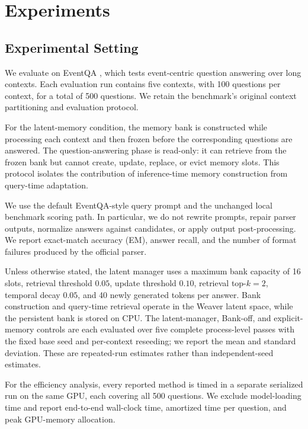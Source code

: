 \section{Experiments}
\label{sec:experiments}

\subsection{Experimental Setting}

We evaluate on EventQA \cite{hu2026evaluating}, which tests event-centric question answering over long contexts.  Each evaluation run contains five contexts, with 100 questions per context, for a total of 500 questions.  We retain the benchmark's original context partitioning and evaluation protocol.

For the latent-memory condition, the memory bank is constructed while processing each context and then frozen before the corresponding questions are answered.  The question-answering phase is read-only: it can retrieve from the frozen bank but cannot create, update, replace, or evict memory slots.  This protocol isolates the contribution of inference-time memory construction from query-time adaptation.

We use the default EventQA-style query prompt and the unchanged local benchmark scoring path.  In particular, we do not rewrite prompts, repair parser outputs, normalize answers against candidates, or apply output post-processing.  We report exact-match accuracy (EM), answer recall, and the number of format failures produced by the official parser.

Unless otherwise stated, the latent manager uses a maximum bank capacity of 16 slots, retrieval threshold $0.05$, update threshold $0.10$, retrieval top-$k=2$, temporal decay $0.05$, and 40 newly generated tokens per answer.  Bank construction and query-time retrieval operate in the Weaver latent space, while the persistent bank is stored on CPU.  The latent-manager, Bank-off, and explicit-memory controls are each evaluated over five complete process-level passes with the fixed base seed and per-context reseeding; we report the mean and standard deviation. These are repeated-run estimates rather than independent-seed estimates.

For the efficiency analysis, every reported method is timed in a separate serialized run on the same GPU, each covering all 500 questions.  We exclude model-loading time and report end-to-end wall-clock time, amortized time per question, and peak GPU-memory allocation.

